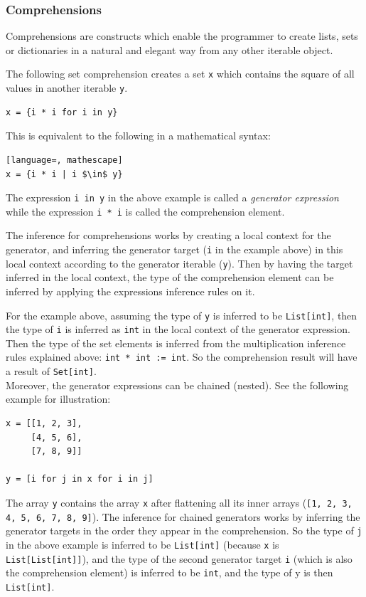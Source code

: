 \subsubsection{Comprehensions}
Comprehensions are constructs which enable the programmer to create lists, sets or dictionaries in a natural and elegant way from any other iterable object.

The following set comprehension creates a set \lstinline|x| which contains the square of all values in another iterable \lstinline|y|.

\begin{lstlisting}
x = {i * i for i in y}
\end{lstlisting}

This is equivalent to the following in a mathematical syntax:
\begin{lstlisting}[language=, mathescape]
x = {i * i | i $\in$ y}
\end{lstlisting}

The expression \lstinline|i in y| in the above example is called a \textit{generator expression} while the expression \lstinline|i * i| is called the comprehension element.

The inference for comprehensions works by creating a local context for the generator, and inferring the generator target (\lstinline|i| in the example above) in this local context according to the generator iterable (\lstinline|y|). Then by having the target inferred in the local context, the type of the comprehension element can be inferred by applying the expressions inference rules on it.

For the example above, assuming the type of \lstinline|y| is inferred to be \lstinline|List[int]|, then the type of \lstinline|i| is inferred as \lstinline|int| in the local context of the generator expression. Then the type of the set elements is inferred from the multiplication inference rules explained above: \lstinline|int * int := int|. So the comprehension result will have a result of \lstinline|Set[int]|. \\

Moreover, the generator expressions can be chained (nested). See the following example for illustration:

\begin{lstlisting}
x = [[1, 2, 3],
     [4, 5, 6],
     [7, 8, 9]]
	 
y = [i for j in x for i in j]
\end{lstlisting}

The array \lstinline|y| contains the array \lstinline|x| after flattening all its inner arrays (\lstinline|[1, 2, 3, 4, 5, 6, 7, 8, 9]|). The inference for chained generators works by inferring the generator targets in the order they appear in the comprehension. So the type of \lstinline|j| in the above example is inferred to be \lstinline|List[int]| (because \lstinline|x| is \lstinline|List[List[int]]|), and the type of the second generator target \lstinline|i| (which is also the comprehension element) is inferred to be \lstinline|int|, and the type of y is then \lstinline|List[int]|.

